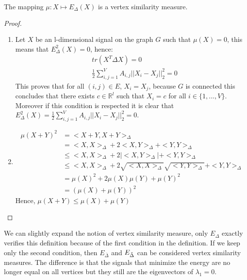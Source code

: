 \documentclass[12pt]{article}
\begin{document}
\begin{thm}
    The mapping $\mu: X \mapsto E_{\Delta}(X)$ is a vertex similarity measure.
\end{thm}

\begin{proof}
    \begin{enumerate}
        \item Let $X$ be an l-dimensional signal on the graph $G$ such that $\mu(X) = 0$, this means that $E^2_{\Delta}(X) = 0$, hence:
        \begin{align*}
            &tr(X^T \Delta X) = 0 \\
            &\frac{1}{2} \sum_{i,j = 1}^V A_{i,j} ||X_i -X_j||_2^2 = 0
        \end{align*}
        This proves that for all $(i,j) \in E$, $X_i = X_j$, because $G$ is connected this concludes that there exists $c \in \mathbb{R}^l$ such that $X_i = c$ for all $i \in \{1,...,V\}$.
        Moreover if this condition is respected it is clear that $E_{\Delta}^2(X)=   \frac{1}{2} \sum_{i,j = 1}^V A_{i,j} ||X_i -X_j||_2^2 = 0$.

        \item 
        \begin{align*}
            \mu(X+Y)^2 &= <X+Y,X+Y>_{\Delta} \\
                        &= <X,X>_{\Delta} + 2<X,Y>_{\Delta} + <Y,Y>_{\Delta} \\
                        &\leq <X,X>_{\Delta}+ 2|<X,Y>_{\Delta}| + <Y,Y>_{\Delta} \\
                        &\leq <X,X>_{\Delta}+ 2\sqrt{<X,X>_{\Delta}}\sqrt{<Y,Y>_{\Delta}} + <Y,Y>_{\Delta} \\
                        &= \mu(X)^2 + 2\mu(X)\mu(Y) + \mu(Y)^2 \\
                        &= (\mu(X) + \mu(Y))^2
        \end{align*}
        \noindent Hence, $\mu(X+Y) \leq \mu(X) + \mu(Y)$
    \end{enumerate}
\end{proof}

We can slightly expand the notion of vertex similarity measure, only $E_{\Delta}$ exactly verifies this definition because of the first condition in the definition. If we keep only the second condition, then  $E_{\bar{\Delta}}$ and $E_{\Tilde{\Delta}}$ can be considered vertex similarity measures. The difference is that the signals that minimize the energy are no longer equal on all vertices but they still are the eigenvectors of $\lambda_1 = 0$.
\end{document}
